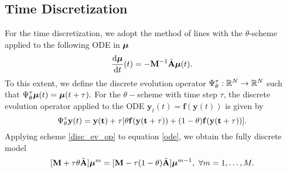 \subsection{Time Discretization} 
For the time discretization, we adopt the method of lines with the $\theta$-scheme applied to the following ODE in $\bm{\mu}$
\begin{equation} \label{ode}
\frac{\text{d}\bm{\mu}}{\text{d}t}(t) =-\mathbf{M}^{-1}\tilde{\mathbf{A}}\bm{\mu}(t). 
\end{equation}
To this extent, we define the discrete evolution operator $\Psi^{\tau}_{\theta}: \mathbb{R}^N \to \mathbb{R}^N$ such that $\Psi^{\tau}_{\theta}\bm{\mu}(t) = \bm{\mu}(t+\tau).$
For the $\theta-$scheme with time step $\tau$, the discrete evolution operator applied to the ODE $\mathbf{y}_t(t) = \mathbf{f}(\mathbf{y}(t))$ is given by 
\begin{equation} \label{disc_ev_op}
\Psi^{\tau}_{\theta} \mathbf{y}(t) = \mathbf{y(t)} +\tau[\theta\mathbf{f}(\mathbf{\mathbf{y}(t+\tau)}) + (1-\theta)\mathbf{f}(\mathbf{\mathbf{y}(t+\tau)})].
\end{equation}
Applying scheme \eqref{disc_ev_op} to equation \eqref{ode}, we obtain the fully discrete model
\begin{equation} \label{full_disc}
[\mathbf{M}+\tau\theta\tilde{\mathbf{A}}]\bm{\mu}^m = [\mathbf{M} - \tau(1-\theta)\tilde{\mathbf{A}}]\bm{\mu}^{m-1},  \ \forall m=1,\dots,M. 
\end{equation}


